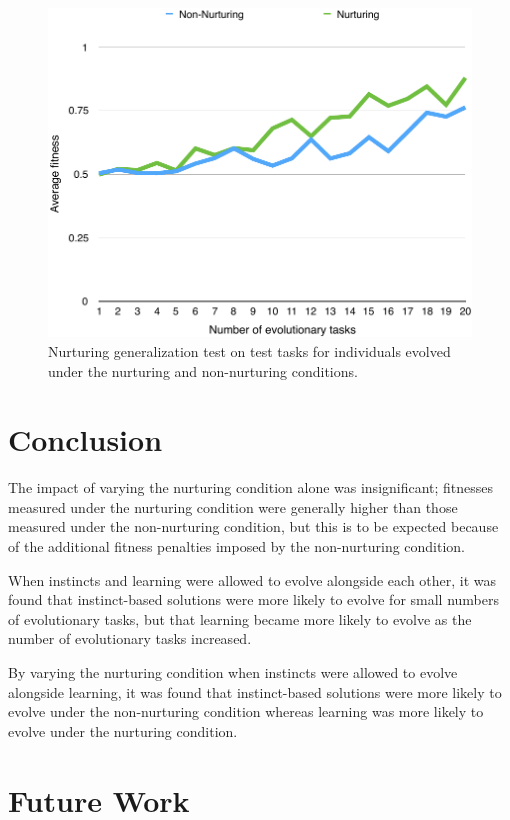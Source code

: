 \documentclass[master]{outhesis}
\begin{document}
\begin{figure}[H]
	\centering
	\includegraphics{NurturingGeneralizationTestPlot.pdf}
	\caption{Nurturing generalization test on test tasks for individuals evolved under the nurturing and non-nurturing conditions.}
\end{figure}

\chapter{Conclusion}

The impact of varying the nurturing condition alone was insignificant; fitnesses measured under the nurturing condition were generally higher than those measured under the non-nurturing condition, but this is to be expected because of the additional fitness penalties imposed by the non-nurturing condition.

When instincts and learning were allowed to evolve alongside each other, it was found that instinct-based solutions were more likely to evolve for small numbers of evolutionary tasks, but that learning became more likely to evolve as the number of evolutionary tasks increased.

By varying the nurturing condition when instincts were allowed to evolve alongside learning, it was found that instinct-based solutions were more likely to evolve under the non-nurturing condition whereas learning was more likely to evolve under the nurturing condition.

\chapter{Future Work}
\end{document}

